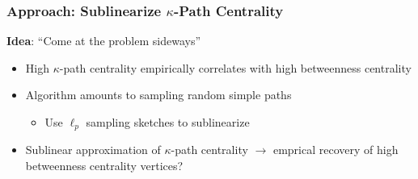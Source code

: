 \documentclass{beamer}
\begin{document}
\begin{frame}
\frametitle{Approach: Sublinearize $\kappa$-Path Centrality}

\textbf{Idea}: ``Come at the problem sideways''
\begin{itemize}
	\item High $\kappa$-path centrality empirically correlates with high betweenness centrality \cite{kourtellis2013identifying}%
	\item Algorithm amounts to sampling random simple paths
	\begin{itemize}
		\item Use $\ell_p$ sampling sketches to sublinearize
	\end{itemize}
	\item Sublinear approximation of $\kappa$-path centrality $\rightarrow$ emprical recovery of high betweenness centrality vertices?
\end{itemize}

\begin{dynblock}
\end{dynblock}


\end{frame}



\end{document}
